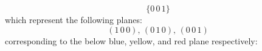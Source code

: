 \begin{itemize}
    \begin{equation}
        \{0\,0\,1\}
    \end{equation}
    which represent the following planes:
    \begin{equation}
        (1\,0\,0),\, (0\,1\,0),\, (0\,0\,1)
    \end{equation}
    corresponding to the below blue, yellow, and red plane respectively:
    \begin{center}
    \end{center}
\end{itemize}